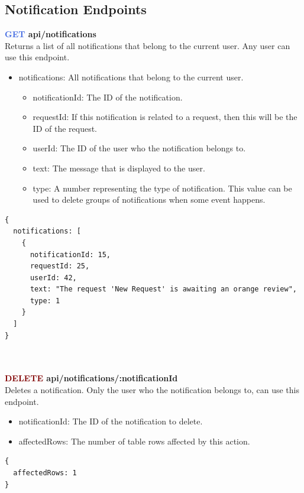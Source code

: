 \documentclass[onecolumn, draftclsnofoot,10pt, compsoc, usenames, dvipsnames]{IEEEtran}
\begin{document}
\subsection{Notification Endpoints}


\noindent
\textbf{\textcolor{RoyalBlue}{GET} api/notifications} \\
Returns a list of all notifications that belong to the current user. Any user can use this endpoint.
\begin{itemize}
    \item notifications: All notifications that belong to the current user.
    \begin{itemize}
        \item notificationId: The ID of the notification.
        \item requestId: If this notification is related to a request, then this will be the ID of the request.
        \item userId: The ID of the user who the notification belongs to.
        \item text: The message that is displayed to the user.
        \item type: A number representing the type of notification. This value can be used to delete groups of notifications when some event happens.
    \end{itemize}
\end{itemize}
\begin{lstlisting}[caption=Example Response]
{ 
  notifications: [
    {
      notificationId: 15,
      requestId: 25,
      userId: 42,
      text: "The request 'New Request' is awaiting an orange review",
      type: 1
    }
  ]
}
\end{lstlisting}
\\~\\


\noindent
\textbf{\textcolor{Maroon}{DELETE} api/notifications/:notificationId} \\
Deletes a notification. Only the user who the notification belongs to, can use this endpoint.
\begin{itemize}
    \item notificationId: The ID of the notification to delete.
    \item affectedRows: The number of table rows affected by this action.
\end{itemize}
\begin{lstlisting}[caption=Example Response]
{ 
  affectedRows: 1
}
\end{lstlisting}
\\~\\
\end{document}

